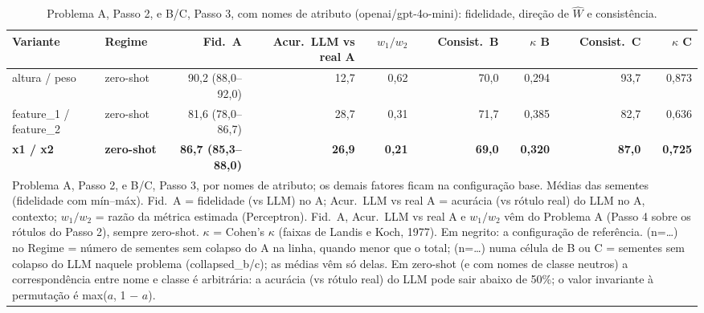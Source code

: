\begin{table}[htbp]
\centering
\small
\caption{Problema A, Passo 2, e B/C, Passo 3, com nomes de atributo (openai/gpt-4o-mini): fidelidade, direção de $\hat{W}$ e consistência.}
\label{tab:bloco1_vies_nomes_atributo_gpt4mini}
\begin{tabular}{llrrrrrrr}
\toprule
Variante & Regime & Fid.\ A & Acur.\ LLM vs real A & $w_1/w_2$ & Consist.\ B & $\kappa$ B & Consist.\ C & $\kappa$ C \\
\midrule
altura / peso & zero-shot & 90,2 (88,0–92,0) & 12,7 & 0,62 & 70,0 & 0,294 & 93,7 & 0,873 \\
feature\_1 / feature\_2 & zero-shot & 81,6 (78,0–86,7) & 28,7 & 0,31 & 71,7 & 0,385 & 82,7 & 0,636 \\
\textbf{x1 / x2} & \textbf{zero-shot} & \textbf{86,7 (85,3–88,0)} & \textbf{26,9} & \textbf{0,21} & \textbf{69,0} & \textbf{0,320} & \textbf{87,0} & \textbf{0,725} \\
\bottomrule
\multicolumn{9}{p{0.95\linewidth}}{\footnotesize Problema A, Passo 2, e B/C, Passo 3, por nomes de atributo; os demais fatores ficam na configuração base. Médias das sementes (fidelidade com mín–máx). Fid.\ A = fidelidade (vs LLM) no A; Acur.\ LLM vs real A = acurácia (vs rótulo real) do LLM no A, contexto; $w_1/w_2$ = razão da métrica estimada (Perceptron). Fid.\ A, Acur.\ LLM vs real A e $w_1/w_2$ vêm do Problema A (Passo 4 sobre os rótulos do Passo 2), sempre zero-shot. $\kappa$ = Cohen's $\kappa$ (faixas de Landis e Koch, 1977). Em negrito: a configuração de referência. (n=…) no Regime = número de sementes sem colapso do A na linha, quando menor que o total; (n=…) numa célula de B ou C = sementes sem colapso do LLM naquele problema (collapsed\_b/c); as médias vêm só delas. Em zero-shot (e com nomes de classe neutros) a correspondência entre nome e classe é arbitrária: a acurácia (vs rótulo real) do LLM pode sair abaixo de 50\%; o valor invariante à permutação é max($a$, 1 $-$ $a$).} \\
\end{tabular}
\end{table}

